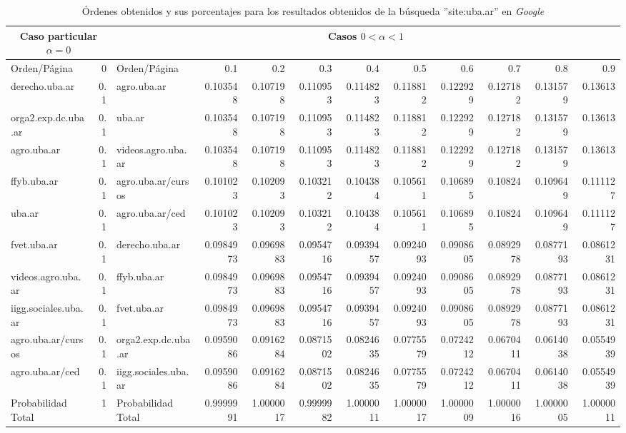 \begin{table}[hb]
    \centering
    \caption{\'Ordenes obtenidos y sus porcentajes para los resultados obtenidos
        de la b\'usqueda ''site:uba.ar'' en \emph{Google}}
    \label{tbl:orden_segun_c}
    \setlength{\tabcolsep}{3pt}
    \begin{tabular}{|l||r||l||r|r|r|r|r|r|r|r|r|}
        \hline\hline
        \multicolumn{2}{|c||}{Caso particular $\alpha = 0$}&
        \multicolumn{10}{c|}{Casos $0 < \alpha < 1$}\\
        \hline
        Orden/P\'agina & 0 & Orden/P\'agina & 0.1&0.2&0.3&0.4&0.5&0.6&0.7&0.8&0.9\\
        \hline\hline
        derecho.uba.ar& 0.1& 
        agro.uba.ar& 0.103548& 0.107198 & 0.110953 & 0.114823 & 0.118812 &
        0.122929 & 0.127182 & 0.131579 & 0.13613\\
        orga2.exp.dc.uba.ar& 0.1&
        uba.ar& 0.103548& 0.107198 & 0.110953 & 0.114823
        & 0.118812 & 0.122929 & 0.127182 & 0.131579 & 0.13613\\
        agro.uba.ar& 0.1&
        videos.agro.uba.ar& 0.103548& 0.107198 & 0.110953 & 0.114823 & 0.118812
        & 0.122929 & 0.127182 & 0.131579 & 0.13613\\
        ffyb.uba.ar& 0.1&
        agro.uba.ar/cursos& 0.101023& 0.102093 & 0.103212 & 0.104384
        & 0.105611 & 0.106895 & 0.10824& 0.109649 & 0.111127\\
        uba.ar& 0.1&
        agro.uba.ar/ced& 0.101023& 0.102093 & 0.103212 & 0.104384
        & 0.105611 & 0.106895 & 0.10824& 0.109649 & 0.111127\\
        fvet.uba.ar& 0.1&
        derecho.uba.ar& 0.0984973& 0.0969883& 0.0954716& 0.0939457&
        0.0924093& 0.0908605& 0.0892978& 0.0877193& 0.0861231\\
        videos.agro.uba.ar& 0.1&
        ffyb.uba.ar& 0.0984973& 0.0969883& 0.0954716& 0.0939457
        & 0.0924093& 0.0908605& 0.0892978& 0.0877193& 0.0861231\\
        iigg.sociales.uba.ar& 0.1&
        fvet.uba.ar& 0.0984973& 0.0969883& 0.0954716& 0.0939457
        & 0.0924093& 0.0908605& 0.0892978& 0.0877193& 0.0861231\\
        agro.uba.ar/cursos& 0.1&
        orga2.exp.dc.uba.ar& 0.0959086& 0.0916284& 0.0871502& 0.0824635& 0.0775579&
        0.0724212& 0.0670411& 0.0614038& 0.0554939\\
        agro.uba.ar/ced& 0.1&
        iigg.sociales.uba.ar& 0.0959086& 0.0916284& 0.0871502& 0.0824635
        & 0.0775579& 0.0724212& 0.0670411& 0.0614038& 0.0554939\\
        \hline
        Probabilidad Total& 1&
        Probabilidad Total& 0.9999991& 1.0000017& 0.9999982& 1.0000011&
        1.0000017& 1.0000009& 1.0000016& 1.0000005& 1.0000011\\
        \hline\hline
    \end{tabular}
\end{table}

